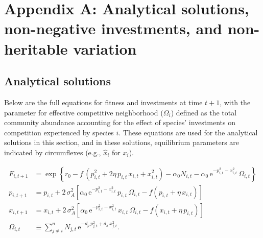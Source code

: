 
\renewcommand{\thefigure}{A\arabic{displayFigure}}
\renewcommand{\theequation}{A\arabic{displayEquation}}
\renewcommand{\thetable}{A\arabic{displayTable}}
\setcounter{displayFigure}{0}
\setcounter{displayEquation}{0}
\setcounter{displayTable}{0}


\section*{Appendix A: Analytical solutions, non-negative investments, and non-heritable variation}



\subsection*{Analytical solutions}

Below are the full equations for fitness and investments at time
\(t + 1\), with the parameter for effective competitive neighborhood
(\(\Omega_{i}\)) defined as the total community abundance accounting for
the effect of species' investments on competition experienced by species
\(i\). These equations are used for the analytical solutions in this
section, and in these solutions, equilibrium parameters are indicated by
circumflexes (e.g., \({\hat{x}}_{i}\) for \(x_{i}\)).


\begin{equation}
\label{eq:analytical-equations}
\begin{split}
    F_{i,t+1} &= \exp\left\{
        r_0 - f \, \left( p_{i,t}^2 + 2 \eta \, p_{i,t} \, x_{i,t} + x_{i,t}^2 \right)
        - \alpha_0 N_{i,t} - \alpha_0 \, \text{e}^{-p_{i,t}^2 - x_{i,t}^2} \, \Omega_{i,t}
        \right\} \\
    p_{i,t+1} &= p_{i,t} + 2 \, \sigma_A^2 \left[
            \alpha_0 \, \text{e}^{-p_{i,t}^2 - x_{i,t}^2} \, p_{i,t} \,
            \Omega_{i,t}
            - f \left( p_{i,t} + \eta \, x_{i,t} \right) 
        \right] \\
    x_{i,t+1} &= x_{i,t} + 2 \, \sigma_A^2 \left[
            \alpha_0 \, \text{e}^{-p_{i,t}^2 - x_{i,t}^2} \, x_{i,t} \,
            \Omega_{i,t}
            - f \left( x_{i,t} + \eta \, p_{i,t} \right) 
        \right]\\
    \Omega_{i,t} &\equiv \sum_{j \ne i}^{n}{ N_{j,t} \, \text{e}^{ 
                - d_p \, p_{j,t}^2 + d_x \, x_{j,t}^2 } }
    \text{.}
\end{split}
\end{equation}



